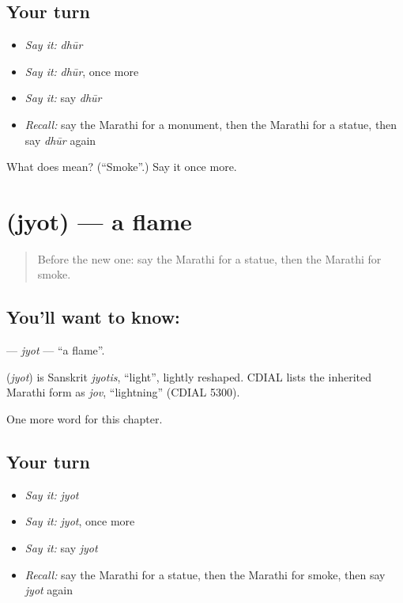 \subsection*{Your turn}
\begin{itemize}
\raggedright
  \item \emph{Say it:} \emph{dhūr}
  \item \emph{Say it:} \emph{dhūr}, once more
  \item \emph{Say it:} say \emph{dhūr}
  \item \emph{Recall:} say the Marathi for a monument, then the Marathi for a statue, then say \emph{dhūr} again
\end{itemize}

\begin{tcolorbox}[breakable,colback=teal!4,colframe=teal!35!black,title={Before you move on}]
What does  mean? (\textquotedblleft{}Smoke\textquotedblright{}.) Say it once more.
\end{tcolorbox}
\section[\texorpdfstring{\mr{ज्योत} (jyot)}{ज्योत (jyot)}]{ (jyot) — a flame}

\label{lesson:MR-C184-jyot}



\begin{quote}
Before the new one: say the Marathi for a statue, then the Marathi for smoke.
\end{quote}

\subsection*{You'll want to know: }
\textbf{} — \emph{jyot} — \textquotedblleft{}a flame\textquotedblright{}.

\begin{cousinweb}
\textbf{} (\emph{jyot}) is Sanskrit \emph{jyotis}, \textquotedblleft{}light\textquotedblright{}, lightly reshaped. CDIAL lists the inherited Marathi form as \emph{jov}, \textquotedblleft{}lightning\textquotedblright{} (CDIAL 5300).
\end{cousinweb}

\begin{grammarlens}[title={What you've built}]
One more word for this chapter.
\end{grammarlens}

\subsection*{Your turn}
\begin{itemize}
\raggedright
  \item \emph{Say it:} \emph{jyot}
  \item \emph{Say it:} \emph{jyot}, once more
  \item \emph{Say it:} say \emph{jyot}
  \item \emph{Recall:} say the Marathi for a statue, then the Marathi for smoke, then say \emph{jyot} again
\end{itemize}

